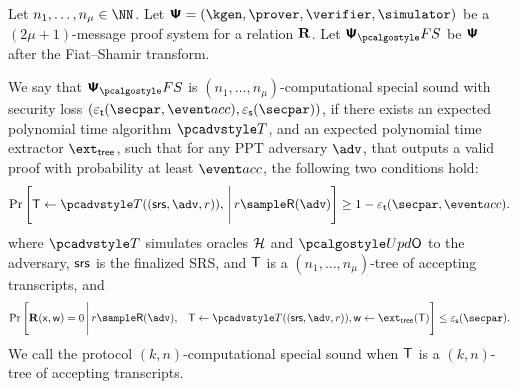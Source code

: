 \begin{definition}
	Let $n_1, \ldots, n_\mu \in \NN$. Let $\proofsystem = (\kgen, \prover, \verifier, \simulator)$ be a $(2 \mu + 1)$-message proof system for a relation $\mathbf{R}$. Let $\proofsystem_\fs$ be $\bm{\mathsf{\Psi}}$ after the Fiat--Shamir transform. 
	
	We say that $\psfs$ is $(n_1, \ldots, n_\mu)$-computational special sound with security loss $(\epst (\secpar, \accProb), \epss(\secpar))$, if there exists an expected polynomial time algorithm $\tdv$, and an expected polynomial time extractor $\extt$, such that for any PPT adversary $\advse$, that outputs a valid proof with probability at least $\accProb$, the following two conditions hold:
	\begin{align*}
	\Pr\left[
  	\tree \gets \tdv((\srs,\adv,r)),
	\,\Biggl|\,
	\begin{aligned}
		 r \sample \RND{\advse}%
	\end{aligned}
	\right] \geq 1 - \epst(\secpar, \accProb).
	\end{align*}
where $\tdv$ simulates oracles $\mathcal{H}$ and $\initU$ to the adversary, $\mathsf{srs}$ is the finalized SRS, and $\mathsf{T}$ is a $(n_1, \ldots, n_\mu)$-tree of accepting transcripts, and
	\begin{align*}
	\Pr\left[
	\REL(\inp, \wit) = 0
	\,\Biggl|\,
	\begin{aligned}
	& r \sample \RND{\advse},
	&    \tree \gets \tdv((\srs,\adv,r)),
	\wit \gets \extt(\tree)
	\end{aligned}
	\right] \leq \epss(\secpar).
	\end{align*}
	 We call the protocol $(k, n)$-computational special sound when $\mathsf{T}$ is a $(k, n)$-tree of accepting transcripts.
\end{definition}

